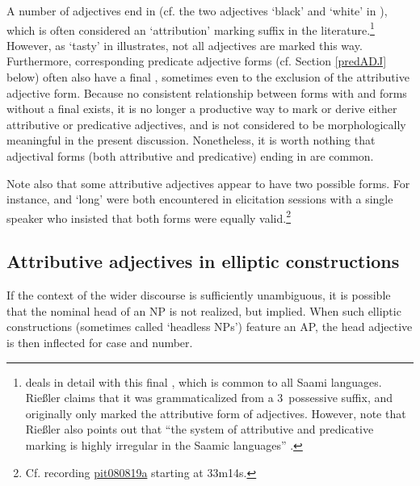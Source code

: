 A number of adjectives end in  (cf. the two adjectives  ‘black’ and  ‘white’ in ), which is often considered an ‘attribution’ marking suffix in the literature.\footnote{\citet[215-228]{Riessler2011} deals in detail with this final , which is common to all Saami languages. Rießler claims that it was grammaticalized from a 3\SGs\ possessive suffix, and originally only marked the attributive form of adjectives. However, note that Rießler also points out that “the system of attributive and predicative marking is highly irregular in the Saamic languages” \citep[215]{Riessler2011}.} 
However, as  ‘tasty’ in  illustrates, not all adjectives are marked this way. Furthermore, corresponding predicate adjective forms (cf. Section \ref{predADJ} below) often also have a final , sometimes even to the exclusion of the attributive adjective form. Because no consistent relationship between forms with and forms without a final  exists, it is no longer a productive way to mark or derive either attributive or predicative adjectives, and is not considered to be morphologically meaningful in the present discussion. Nonetheless, it is worth nothing that adjectival forms (both attributive and predicative) ending in  are common. 

Note also that some attributive adjectives appear to have two possible forms. For instance,  and  ‘long’ were both encountered in elicitation sessions with a single speaker who insisted that both forms were equally valid.\footnote{Cf. recording \hyperlink{pit080819a}{pit080819a} starting at 33m14s.} %


\subsection{Attributive adjectives in elliptic constructions}\label{ADJinHeadlessNPs}
If the context of the wider discourse is sufficiently unambiguous, it is possible that the nominal head of an NP is not realized, but implied. %
When such elliptic constructions (sometimes called ‘headless NPs’) feature an AP, the head adjective is then inflected for case and number. 


